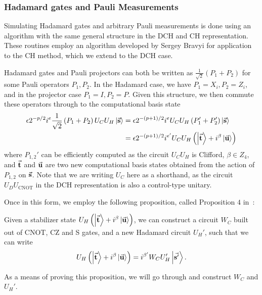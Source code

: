 \subsubsection{Hadamard gates and Pauli Measurements}
Simulating Hadamard gates and arbitrary Pauli measurements is done using an algorithm with the same general structure in the DCH and CH representation. These routines employ an algorithm developed by Sergey Bravyi for application to the CH method,  which we extend to the DCH case.\par
Hadamard gates and Pauli projectors can both be written as $\frac{1}{\sqrt{2}}\left(P_{1}+P_{2}\right)$ for some Pauli operators $P_{1},P_{2}$. In the Hadamard case, we have $P_{1}=X_{i},P_{2}=Z_{i}$, and in the projector case $P_{1}=I,P_{2}=P$. Given this structure, we then commute these operators through to the computational basis state
\begin{align*}
\epsilon 2^{-p/2}i^{e}\frac{1}{\sqrt{2}}\left(P_{1}+P_{2}\right)U_{C}U_{H}\ket{\va{s}} &=
\epsilon 2^{-(p+1)/2}i^{e} U_{C}U_{H}\left(P_{1}'+P_{2}'\right)\ket{\va{s}} \\ 
&= \epsilon 2^{-(p+1)/2}i^{e'} U_{C}U_{H}\left(\ket{\va{t}}+i^{\beta}\ket{\va{u}}\right)
\end{align*}
where $P_{1,2}'$ can be efficiently computed as the circuit $U_{C}U_{H}$ is Clifford, $\beta\in\mathbb{}Z_{4}$, and $\va{t}$ and $\va{u}$ are two new computational basis states obtained from the action of $P_{1,2}$ on $\va{s}$. Note that we are writing $U_{C}$ here as a shorthand, as the circuit $U_{D}U_{\text{CNOT}}$ in the DCH representation is also a control-type unitary.\par
Once in this form, we employ the following proposition, called Proposition $4$ in~\cite{Bravyi2018}:
\begin{prop}
\label{prop:pseudocz}
Given a stabilizer state $U_{H}\left(\ket{\va{t}}+i^{\beta}\ket{\va{u}}\right)$, we can construct a circuit $W_{C}$ built out of CNOT, CZ and S gates, and a new Hadamard circuit $U_{H}'$, such that we can write
\[U_{H}\left(\ket{\va{t}}+i^{\beta}\ket{\va{u}}\right) = i^{\beta'}W_{C}U_{H}'\ket{\va{s'}}.\]
\end{prop}
As a means of proving this proposition, we will go through and construct $W_{C}$ and $U_{H}'$.
